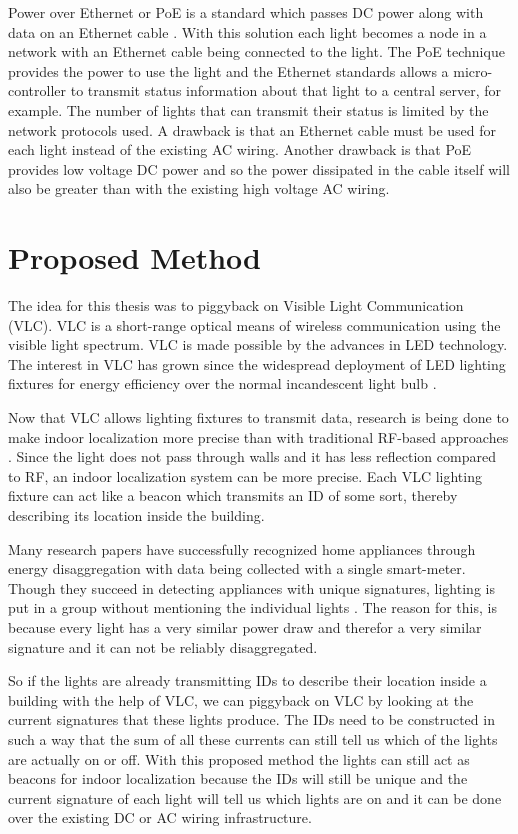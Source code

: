 		Power over Ethernet or PoE is a standard which passes DC power along with data on an Ethernet cable \cite{patoka2003power}.
		With this solution each light becomes a node in a network with an Ethernet cable being connected to the light.
		The PoE technique provides the power to use the light and the Ethernet standards allows a micro-controller to transmit status information about that light to a central server, for example.
		The number of lights that can transmit their status is limited by the network protocols used.
		A drawback is that an Ethernet cable must be used for each light instead of the existing AC wiring.
		Another drawback is that PoE provides low voltage DC power and so the power dissipated in the cable itself will also be greater than with the existing high voltage AC wiring.




	\section{Proposed Method}


	The idea for this thesis was to piggyback on Visible Light Communication (VLC).
	VLC is a short-range optical means of wireless communication using the visible light spectrum.
	VLC is made possible by the advances in LED technology.
	The interest in VLC has grown since the widespread deployment of LED lighting fixtures for energy efficiency over the normal incandescent light bulb \cite{rajagopal2012ieee}.


	Now that VLC allows lighting fixtures to transmit data, research is being done to make indoor localization more precise than with traditional RF-based approaches \cite{Kuo:2014:LIP:2639108.2639109}.
	Since the light does not pass through walls and it has less reflection compared to RF, an indoor localization system can be more precise.
	Each VLC lighting fixture can act like a beacon which transmits an ID of some sort, thereby describing its location inside the building.


	Many research papers have successfully recognized home appliances through energy disaggregation with data being collected with a single smart-meter.   
	Though they succeed in detecting appliances with unique signatures, lighting is put in a group without mentioning the individual lights \cite{kolter2011redd}.
	The reason for this, is because every light has a very similar power draw and therefor a very similar signature and it can not be reliably disaggregated.


	So if the lights are already transmitting IDs to describe their location inside a building with the help of VLC, we can piggyback on VLC by looking at the current signatures that these lights produce.
	The IDs need to be constructed in such a way that the sum of all these currents can still tell us which of the lights are actually on or off.
	With this proposed method the lights can still act as beacons for indoor localization because the IDs will still be unique and the current signature of each light will tell us which lights are on and it can be done over the existing DC or AC wiring infrastructure.


